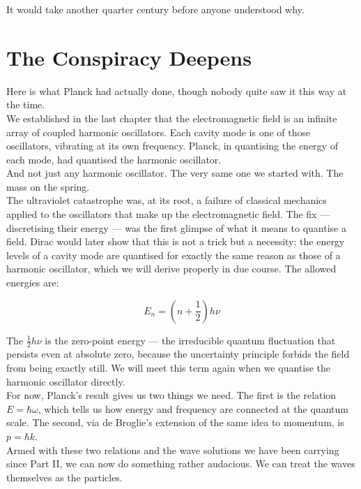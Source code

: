 \documentclass[krantz1,ChapterTOCs]{krantz}
\begin{document}
It would take another quarter century before anyone understood why.\\

\section*{The Conspiracy Deepens}

Here is what Planck had actually done, though nobody quite saw it 
this way at the time.\\

We established in the last chapter that the electromagnetic field is 
an infinite array of coupled harmonic oscillators. Each cavity mode 
is one of those oscillators, vibrating at its own frequency. Planck, 
in quantising the energy of each mode, had quantised the harmonic 
oscillator.\\

And not just any harmonic oscillator. The very same one we started 
with. The mass on the spring.\\

The ultraviolet catastrophe was, at its root, a failure of classical 
mechanics applied to the oscillators that make up the electromagnetic 
field. The fix --- discretising their energy --- was the first glimpse 
of what it means to quantise a field. Dirac would later show that 
this is not a trick but a necessity: the energy levels of a cavity 
mode are quantised for exactly the same reason as those of a harmonic 
oscillator, which we will derive properly in due course. The allowed 
energies are:

$$E_n = \left(n + \frac{1}{2}\right)h\nu$$

The $\frac{1}{2}h\nu$ is the zero-point energy --- the irreducible 
quantum fluctuation that persists even at absolute zero, because the 
uncertainty principle forbids the field from being exactly still. We 
will meet this term again when we quantise the harmonic oscillator 
directly.\\

For now, Planck's result gives us two things we need. The first is 
the relation $E = \hbar\omega$, which tells us how energy and 
frequency are connected at the quantum scale. The second, via 
de Broglie's extension of the same idea to momentum, is $p = \hbar k$.\\

Armed with these two relations and the wave solutions we have been 
carrying since Part II, we can now do something rather audacious. 
We can treat the waves themselves as the particles.\\
\end{document}
